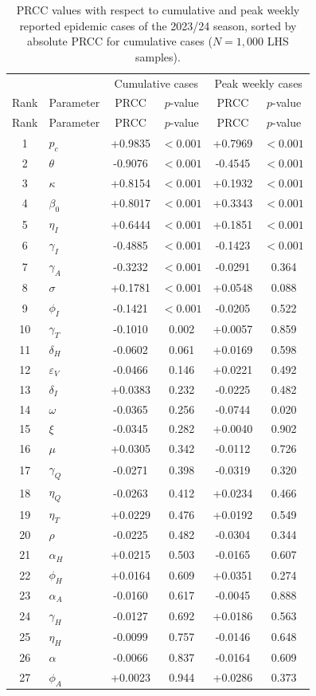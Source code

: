 \documentclass[12pt,a4paper]{article}
\theoremstyle{definition}
\theoremstyle{remark}
\begin{document}
\begin{longtable}{clcccc}
\caption{PRCC values with respect to cumulative and peak weekly reported epidemic cases of the 2023/24 season, sorted by absolute PRCC for cumulative cases ($N = 1{,}000$ LHS samples).}\label{tab:PRCC_burden}\\
\hline
 & & \multicolumn{2}{c}{Cumulative cases} & \multicolumn{2}{c}{Peak weekly cases}\\
Rank & Parameter & PRCC & $p$-value & PRCC & $p$-value\\ \hline
\endfirsthead
\hline
Rank & Parameter & PRCC & $p$-value & PRCC & $p$-value\\ \hline
\endhead
1 & $p_c$ & +0.9835 & $<0.001$ & +0.7969 & $<0.001$ \\
2 & $\theta$ & -0.9076 & $<0.001$ & -0.4545 & $<0.001$ \\
3 & $\kappa$ & +0.8154 & $<0.001$ & +0.1932 & $<0.001$ \\
4 & $\beta_0$ & +0.8017 & $<0.001$ & +0.3343 & $<0.001$ \\
5 & $\eta_I$ & +0.6444 & $<0.001$ & +0.1851 & $<0.001$ \\
6 & $\gamma_I$ & -0.4885 & $<0.001$ & -0.1423 & $<0.001$ \\
7 & $\gamma_A$ & -0.3232 & $<0.001$ & -0.0291 & 0.364 \\
8 & $\sigma$ & +0.1781 & $<0.001$ & +0.0548 & 0.088 \\
9 & $\phi_I$ & -0.1421 & $<0.001$ & -0.0205 & 0.522 \\
10 & $\gamma_T$ & -0.1010 & 0.002 & +0.0057 & 0.859 \\
11 & $\delta_H$ & -0.0602 & 0.061 & +0.0169 & 0.598 \\
12 & $\varepsilon_V$ & -0.0466 & 0.146 & +0.0221 & 0.492 \\
13 & $\delta_I$ & +0.0383 & 0.232 & -0.0225 & 0.482 \\
14 & $\omega$ & -0.0365 & 0.256 & -0.0744 & 0.020 \\
15 & $\xi$ & -0.0345 & 0.282 & +0.0040 & 0.902 \\
16 & $\mu$ & +0.0305 & 0.342 & -0.0112 & 0.726 \\
17 & $\gamma_Q$ & -0.0271 & 0.398 & -0.0319 & 0.320 \\
18 & $\eta_Q$ & -0.0263 & 0.412 & +0.0234 & 0.466 \\
19 & $\eta_T$ & +0.0229 & 0.476 & +0.0192 & 0.549 \\
20 & $\rho$ & -0.0225 & 0.482 & -0.0304 & 0.344 \\
21 & $\alpha_H$ & +0.0215 & 0.503 & -0.0165 & 0.607 \\
22 & $\phi_H$ & +0.0164 & 0.609 & +0.0351 & 0.274 \\
23 & $\alpha_A$ & -0.0160 & 0.617 & -0.0045 & 0.888 \\
24 & $\gamma_H$ & -0.0127 & 0.692 & +0.0186 & 0.563 \\
25 & $\eta_H$ & -0.0099 & 0.757 & -0.0146 & 0.648 \\
26 & $\alpha$ & -0.0066 & 0.837 & -0.0164 & 0.609 \\
27 & $\phi_A$ & +0.0023 & 0.944 & +0.0286 & 0.373 \\
\hline
\end{longtable}
\end{document}
